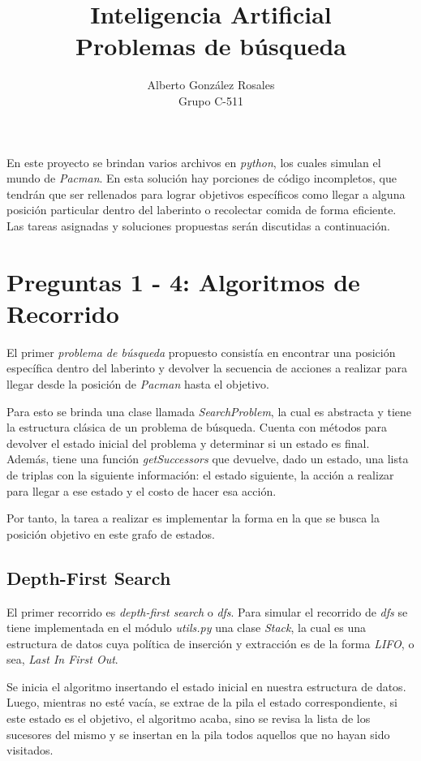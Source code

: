 \documentclass[12pt]{article}
\title{\bf\huge Inteligencia Artificial \\Problemas de b\'usqueda}
\author{\Large Alberto Gonz\'alez Rosales\\
	\large {Grupo C-511}
	}
\date{}
\begin{document}
\maketitle

En este proyecto se brindan varios archivos en \emph{python}, los cuales simulan el mundo de \emph{Pacman}. En esta soluci\'on hay porciones de c\'odigo incompletos, que tendr\'an que ser rellenados para lograr objetivos espec\'ificos como llegar a alguna posici\'on particular dentro del laberinto o recolectar comida de forma eficiente. Las tareas asignadas y soluciones propuestas ser\'an discutidas a continuaci\'on. 

\section{Preguntas 1 - 4: Algoritmos de Recorrido}

El primer \emph{problema de b\'usqueda} propuesto consist\'ia en encontrar una posici\'on espec\'ifica dentro del laberinto y devolver la secuencia de acciones a realizar para llegar desde la posici\'on de \emph{Pacman} hasta el objetivo. 

Para esto se brinda una clase llamada \emph{SearchProblem}, la cual es abstracta y tiene la estructura cl\'asica de un problema de b\'usqueda. Cuenta con m\'etodos para devolver el estado inicial del problema y determinar si un estado es final. Adem\'as, tiene una funci\'on \emph{getSuccessors} que devuelve, dado un estado, una lista de triplas con la siguiente informaci\'on: el estado siguiente, la acci\'on a realizar para llegar a ese estado y el costo de hacer esa acci\'on.

Por tanto, la tarea a realizar es implementar la forma en la que se busca la posici\'on objetivo en este grafo de estados.

\subsection{Depth-First Search}

El primer recorrido es \emph{depth-first search} o \emph{dfs}. Para simular el recorrido de \emph{dfs} se tiene implementada en el m\'odulo \emph{utils.py} una clase \emph{Stack}, la cual es una estructura de datos cuya pol\'itica de inserci\'on y extracci\'on es de la forma \emph{LIFO}, o sea, \emph{Last In First Out}.

Se inicia el algoritmo insertando el estado inicial en nuestra estructura de datos. Luego, mientras no est\'e vac\'ia, se extrae de la pila el estado correspondiente, si este estado es el objetivo, el algoritmo acaba, sino se revisa la lista de los sucesores del mismo y se insertan en la pila todos aquellos que no hayan sido visitados.
\end{document}
